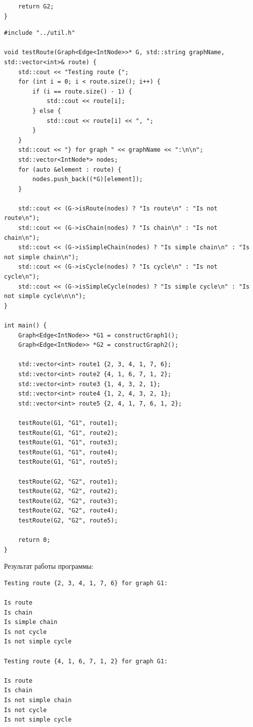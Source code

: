 \documentclass[a4paper,14pt]{extarticle}
\begin{document}
\begin{enumerate}[1.]
\begin{verbatim}
    return G2;
}
        \end{verbatim}

        \begin{verbatim}
#include "../util.h"

void testRoute(Graph<Edge<IntNode>>* G, std::string graphName, std::vector<int>& route) {
    std::cout << "Testing route {";
    for (int i = 0; i < route.size(); i++) {
        if (i == route.size() - 1) {
            std::cout << route[i];
        } else {
            std::cout << route[i] << ", ";
        }
    }
    std::cout << "} for graph " << graphName << ":\n\n";
    std::vector<IntNode*> nodes;
    for (auto &element : route) {
        nodes.push_back((*G)[element]);
    }

    std::cout << (G->isRoute(nodes) ? "Is route\n" : "Is not route\n");
    std::cout << (G->isChain(nodes) ? "Is chain\n" : "Is not chain\n");
    std::cout << (G->isSimpleChain(nodes) ? "Is simple chain\n" : "Is not simple chain\n");
    std::cout << (G->isCycle(nodes) ? "Is cycle\n" : "Is not cycle\n");
    std::cout << (G->isSimpleCycle(nodes) ? "Is simple cycle\n" : "Is not simple cycle\n\n");
}

int main() {
    Graph<Edge<IntNode>> *G1 = constructGraph1();
    Graph<Edge<IntNode>> *G2 = constructGraph2();

    std::vector<int> route1 {2, 3, 4, 1, 7, 6};
    std::vector<int> route2 {4, 1, 6, 7, 1, 2};
    std::vector<int> route3 {1, 4, 3, 2, 1};
    std::vector<int> route4 {1, 2, 4, 3, 2, 1};
    std::vector<int> route5 {2, 4, 1, 7, 6, 1, 2};

    testRoute(G1, "G1", route1);
    testRoute(G1, "G1", route2);
    testRoute(G1, "G1", route3);
    testRoute(G1, "G1", route4);
    testRoute(G1, "G1", route5);

    testRoute(G2, "G2", route1);
    testRoute(G2, "G2", route2);
    testRoute(G2, "G2", route3);
    testRoute(G2, "G2", route4);
    testRoute(G2, "G2", route5);

    return 0;
}
        \end{verbatim}

        Результат работы программы:
        \begin{verbatim}
Testing route {2, 3, 4, 1, 7, 6} for graph G1:

Is route
Is chain
Is simple chain
Is not cycle
Is not simple cycle

Testing route {4, 1, 6, 7, 1, 2} for graph G1:

Is route
Is chain
Is not simple chain
Is not cycle
Is not simple cycle


\end{verbatim}
\end{enumerate}
\end{document}
